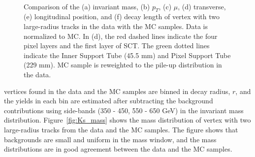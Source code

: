 \begin{figure}[!htb]
     \\
    \caption{Comparison of the (a) invariant mass, (b) $p_{T}$, (c) $\mu$, (d) transverse, (e) longitudinal position, and (f) decay length of \Ks vertex with two large-radius tracks in the data with the MC samples. Data is normalized to MC. In (d), the red dashed lines indicate the four pixel layers and the first layer of SCT. The green dotted lines indicate the Inner Support Tube (45.5 mm) and Pixel Support Tube (229 mm). MC sample is reweighted to the pile-up distribution in the data.}
    \label{fig:Ks_data_MC}
\end{figure}

\Ks vertices found in the data and the MC samples are binned in decay radius, $r$, and the \Ks yields in each bin are estimated after subtracting the background contributions using side-bands (350 - 450, 550 - 650 GeV) in the invariant mass distribution. Figure~\ref{fig:Ks_mass} shows the mass distribution of \Ks vertex with two large-radius tracks from the data and the MC samples. The figure shows that backgrounds are small and uniform in the mass window, and the mass distributions are in good agreement between the data and the MC samples.

